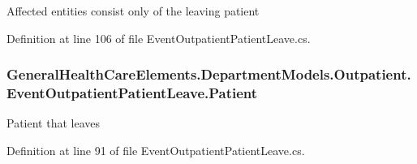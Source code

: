 Affected entities consist only of the leaving patient 



Definition at line 106 of file Event\+Outpatient\+Patient\+Leave.\+cs.

\subsubsection[{\texorpdfstring{Patient}{Patient}}]{ General\+Health\+Care\+Elements.\+Department\+Models.\+Outpatient.\+Event\+Outpatient\+Patient\+Leave.\+Patient\hspace{0.3cm}{\ttfamily [get]}}\hypertarget{class_general_health_care_elements_1_1_department_models_1_1_outpatient_1_1_event_outpatient_patient_leave_a3428aa5af028749eec0cc37e5b029da2}{}\label{class_general_health_care_elements_1_1_department_models_1_1_outpatient_1_1_event_outpatient_patient_leave_a3428aa5af028749eec0cc37e5b029da2}


Patient that leaves 



Definition at line 91 of file Event\+Outpatient\+Patient\+Leave.\+cs.

